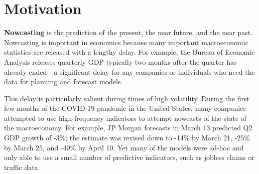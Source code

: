 \documentclass[11pt, letterpaper]{article}\usepackage[]{graphicx}\usepackage[]{color}
\begin{document}




\tableofcontents
\newpage
\section{Motivation}
\textbf{Nowcasting} is the prediction of the present, the near future, and the near past. Nowcasting is important in economics because many important macroeconomic statistics are released with a lengthy delay. For example, the Bureau of Economic Analysis releases quarterly GDP typically two months after the quarter has already ended - a significant delay for any companies or individuals who need the data for planning and forecast models.

This delay is particularly salient during times of high volatility. During the first few months of the COVID-19 pandemic in the United States, many companies attempted to use high-frequency indicators to attempt nowcasts of the state of the macroeconomy. For example, JP Morgan forecasts in March 13 predicted Q2 GDP growth of -3\%; the estimate was revised down to -14\% by March 21, -25\% by March 25, and -40\% by April 10. Yet many of the models were ad-hoc and only able to use a small number of predictive indicators, such as jobless claims or traffic data.
\end{document}
